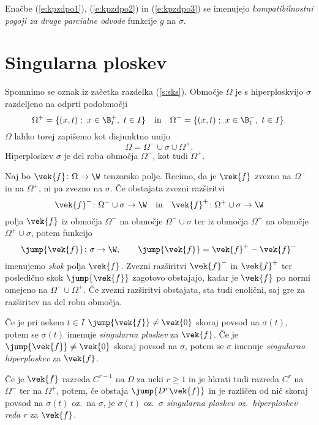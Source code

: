 Enačbe (\ref{e:kpzdpo1}), (\ref{e:kpzdpo2}) in (\ref{e:kpzdpo3}) se imenujejo
\emph{kompatibilnostni pogoji za druge parcialne odvode} funkcije $g$ na $\sigma$.


\section{Singularna ploskev}


Spomnimo se oznak iz začetka razdelka (\ref{s:sks}).
Območje $\Omega$ je s hiperploskvijo $\sigma$ razdeljeno na odprti podobmočji
\[
	\Omega^+=\{(x,t)\;;\ x\in\B_t^+,\ t\in I\}\quad\textrm{in}\quad
	\Omega^-=\{(x,t)\;;\ x\in\B_t^-,\ t\in I\}.
\]
$\Omega$ lahko torej zapišemo kot disjunktno unijo
\[ \Omega=\Omega^-\cup\sigma\cup\Omega^+. \]
Hiperploskev $\sigma$ je del roba območja $\Omega^-$, kot tudi $\Omega^+$.

Naj bo $\vek{f}\colon\Omega\to\W$ tenzorsko polje.
Recimo, da je $\vek{f}$ zvezno na $\Omega^-$ in na $\Omega^+$, ni pa zvezno na $\sigma$.
Če obstajata zvezni razširitvi
\[ \vek{f}^-\colon\Omega^-\cup\sigma\to\W\quad\textrm{in}\quad \vek{f}^+\colon\Omega^+\cup\sigma\to\W \]
polja $\vek{f}$ iz območja $\Omega^-$ na območje $\Omega^-\cup\sigma$ ter iz območja $\Omega^+$ na
območje $\Omega^+\cup\sigma$, potem funkcijo
\[
	\jump{\vek{f}}\colon\sigma\to\W,\qquad \jump{\vek{f}}=\vek{f}^+-\vek{f}^-
\]
imenujemo \emph{skok} polja $\vek{f}$.
Zvezni razširitvi $\vek{f}^-$ in $\vek{f}^+$ ter posledično skok $\jump{\vek{f}}$ zagotovo obstajajo,
kadar je $\vek{f}$ po normi omejeno na $\Omega^-\cup\Omega^+$. Če zvezni razširitvi obstajata,
sta tudi enolični, saj gre za razširitev na del robu območja.

Če je pri nekem $t\in I$ $\jump{\vek{f}}\neq\vek{0}$ skoraj povsod na $\sigma(t)$,
potem se $\sigma(t)$ imenuje \emph{singularna ploskev} za $\vek{f}$. Če je
$\jump{\vek{f}}\neq\vek{0}$ skoraj povsod na $\sigma$, potem se
$\sigma$ imenuje \emph{singularna hiperploskev} za $\vek{f}$.

Če je $\vek{f}$ razreda $C^{r-1}$ na $\Omega$ za neki $r\geq 1$ in je hkrati tudi razreda $C^r$
na $\Omega^-$ ter na $\Omega^+$, potem, če obstaja $\jump{D^r\vek{f}}$ in je različen od nič
skoraj povsod na $\sigma(t)$ oz.~na $\sigma$, je $\sigma(t)$ oz.~$\sigma$ \emph{singularna
ploskev oz.~hiperploskev reda $r$} za $\vek{f}$.

